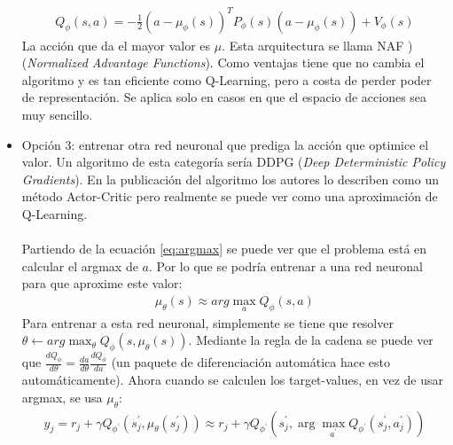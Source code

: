 \begin{itemize}
\begin{figure}[H]
\end{figure}
        \begin{align}
Q _ { \phi } ( s , a ) = - \frac { 1 } { 2 } ( a - \mu _ { \phi } ( s ) ) ^ { T } P _ { \phi } ( s ) ( a - \mu _ { \phi } ( s ) ) + V _ { \phi } ( s )
        \end{align}
        La acción que da el mayor valor es $\mu$. Esta arquitectura se llama NAF
        )(\textit{Normalized Advantage Functions}). Como ventajas tiene que no cambia el
        algoritmo y es tan eficiente como Q-Learning, pero a costa de perder poder de
        representación. Se aplica solo en casos en que el espacio de acciones sea muy
        sencillo.
    \item Opción 3: entrenar otra red neuronal que prediga la acción que optimice el valor.
        Un algoritmo de esta categoría sería DDPG (\textit{Deep Deterministic Policy
        Gradients}). En la publicación del algoritmo los autores lo describen como un
        método Actor-Critic pero realmente se puede ver como una aproximación de
        Q-Learning.\\\\Partiendo de la ecuación \ref{eq:argmax} se puede ver que el problema está
        en calcular el argmax de $a$. Por lo que se podría entrenar a una red neuronal para
        que aproxime este valor: 
         \begin{align}
             \mu_\theta(s) \approx arg\max_a Q_\phi(s,a)
        \end{align}
        Para entrenar a esta red neuronal, simplemente se tiene que resolver $\theta \gets
        arg\max_\theta Q_\phi(s,\mu_\theta(s))$. Mediante la regla de la cadena se puede ver
        que $\frac{dQ_\phi}{d\theta} = \frac{da}{d\theta}\frac{dQ_\phi}{da}$ 
        (un paquete de diferenciación automática hace esto automáticamente). Ahora cuando se
        calculen los target-values, en vez de usar argmax, se usa $\mu_\theta$:
        \begin{align}
y _ { j } = r _ { j } + \gamma Q _ { \phi ^ { \prime } } ( s _ { j } ^ { \prime } , \mu _ { \theta } ( s _ { j } ^ { \prime } ) ) \approx r _ { j } + \gamma Q _ { \phi ^ { \prime } } ( s _ { j } ^ { \prime } , \operatorname { arg } \operatorname { max } _ { a ^ { \prime } } Q _ { \phi ^ { \prime } } ( s _ { j } ^ { \prime } , a _ { j } ^ { \prime } ) )
        \end{align}


\end{itemize}
